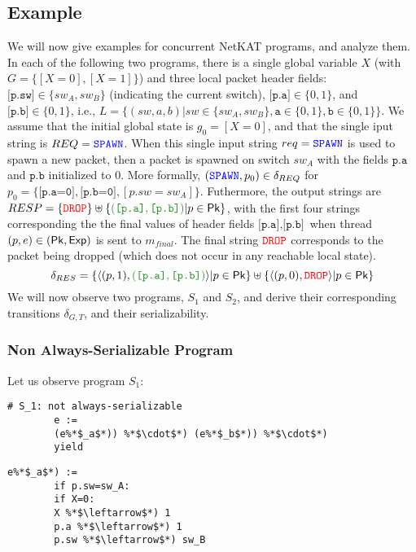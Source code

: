 	
	
	\subsection{Example}
	We will now give examples for concurrent NetKAT programs, and analyze them.
	In each of the following two programs, there is a single global variable $X$ 
	(with 
	$G=\{[X=0],[X=1]\}$) and three local packet 
	header fields: $\texttt{[p.sw]} \in \{sw_A,sw_B\}$ (indicating the current 
	switch), $\texttt{[p.a]} \in 
	\{0,1\}$, and $\texttt{[p.b]} \in \{0,1\}$, i.e., $L=\{(sw,a,b)\vert sw\in 
	\{sw_A,sw_B\}, \texttt{a}\in 
	\{0,1\},\texttt{b}\in \{0,1\}\}$.
	We assume that the initial global state is $g_0=[X=0]$, and that the single 
	iput string is 
	$REQ=\textcolor{blue}{\texttt{SPAWN}}$. When this single input string $req=\textcolor{blue}{\texttt{SPAWN}}$ is used to spawn a 
	new 
	packet, then a packet is spawned on switch $sw_A$ with the fields 
	$\texttt{p.a}$ and $\texttt{p.b}$ 
	initialized to 0. More formally, $(\textcolor{blue}{\texttt{SPAWN}},p_0) \in \delta_{REQ}$ for 
	$p_0=\{\texttt{[p.a=0]},\texttt{[p.b=0]},[p.sw=sw_A]\}$.
	Futhermore, the output strings are 
	$RESP=
	\{\DROP\}
	\uplus
	\{
	\textcolor{ForestGreen}{(\texttt{[p.a]},\texttt{[p.b]})} 
	\vert
	p \in \Pk
	\}$, 
	with the first 
	four strings corresponding the the final values of header fields 
	$\texttt{[p.a]},\texttt{[p.b]}$ when thread $(p,e) 
	\in (\mathsf{Pk}, \mathsf{Exp})$ is sent to $m_{final}$. The final string $\textcolor{red}{\texttt{DROP}}$ corresponds 
	to the packet being 
	dropped (which does not occur in any reachable local state).
	\[
	\delta_{RES} = 
	\{
	\langle (p,1),\textcolor{ForestGreen}{(\texttt{[p.a]},\texttt{[p.b]})} \rangle 
	\vert
	p \in \Pk
	\}
	\uplus
	\{
	\langle (p,0),\DROP \rangle 
	\vert
	p \in \Pk
	\}
	\]
	We will now observe two programs, $S_1$ and $S_2$, and derive their 
	corresponding transitions 
	$\delta_{G,T}$, and their serializability.
	
	
	\subsubsection{Non Always-Serializable Program}
	Let us observe program $S_1$: 
	
	\begin{lstlisting}[style=pythonStyle]
		# S_1: not always-serializable
		e := 
		(e%*$_a$*)) %*$\cdot$*) (e%*$_b$*))	%*$\cdot$*)
		yield
	\end{lstlisting}
	
	\begin{lstlisting}[style=pythonStyle]
		e%*$_a$*) := 
		if p.sw=sw_A: 
		if X=0:
		X %*$\leftarrow$*) 1		
		p.a %*$\leftarrow$*) 1
		p.sw %*$\leftarrow$*) sw_B	
	\end{lstlisting}
	
